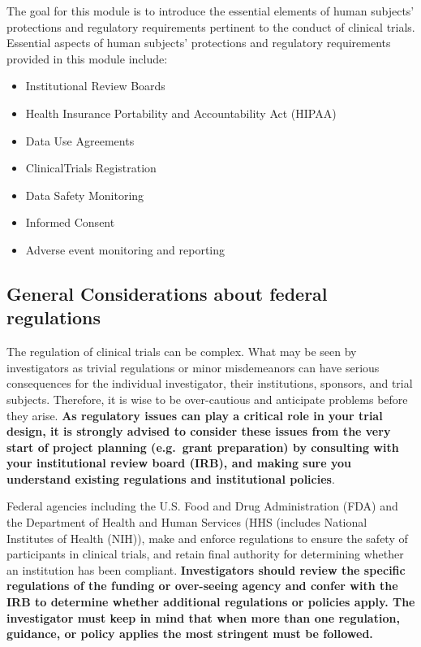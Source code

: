 \documentclass[]{book}
\providecommand{\tightlist}{%
  \setlength{\itemsep}{0pt}\setlength{\parskip}{0pt}}
\begin{document}
The goal for this module is to introduce the essential elements of human
subjects' protections and regulatory requirements pertinent to the
conduct of clinical trials. Essential aspects of human subjects'
protections and regulatory requirements provided in this module include:

\begin{itemize}
\tightlist
\item
  Institutional Review Boards
\item
  Health Insurance Portability and Accountability Act (HIPAA)
\item
  Data Use Agreements
\item
  ClinicalTrials Registration
\item
  Data Safety Monitoring
\item
  Informed Consent
\item
  Adverse event monitoring and reporting
\end{itemize}

\subsection{General Considerations about federal
regulations}\label{general-considerations-about-federal-regulations}

The regulation of clinical trials can be complex. What may be seen by
investigators as trivial regulations or minor misdemeanors can have
serious consequences for the individual investigator, their
institutions, sponsors, and trial subjects. Therefore, it is wise to be
over-cautious and anticipate problems before they arise. \textbf{As
regulatory issues can play a critical role in your trial design, it is
strongly advised to consider these issues from the very start of project
planning (e.g.~grant preparation) by consulting with your institutional
review board (IRB), and making sure you understand existing regulations
and institutional policies}.

Federal agencies including the U.S. Food and Drug Administration (FDA)
and the Department of Health and Human Services (HHS (includes National
Institutes of Health (NIH)), make and enforce regulations to ensure the
safety of participants in clinical trials, and retain final authority
for determining whether an institution has been compliant.
\textbf{Investigators should review the specific regulations of the
funding or over-seeing agency and confer with the IRB to determine
whether additional regulations or policies apply. The investigator must
keep in mind that when more than one regulation, guidance, or policy
applies the most stringent must be followed.}
\end{document}
